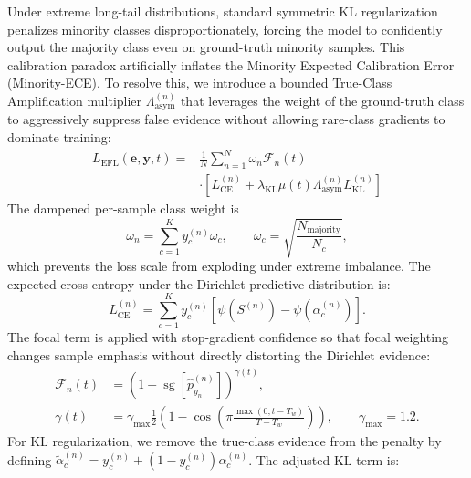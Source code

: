 \documentclass[letterpaper]{article} %
\begin{document}
Under extreme long-tail distributions, standard symmetric KL regularization penalizes minority classes disproportionately, forcing the model to confidently output the majority class even on ground-truth minority samples. This calibration paradox artificially inflates the Minority Expected Calibration Error (Minority-ECE). To resolve this, we introduce a bounded True-Class Amplification multiplier $\Lambda_{\text{asym}}^{(n)}$ that leverages the weight of the ground-truth class to aggressively suppress false evidence without allowing rare-class gradients to dominate training:
\begin{equation}\label{eq:efl}
\begin{aligned}
    L_{\text{EFL}}(\bm{e}, \bm{y}, t) ={}& \frac{1}{N} \sum_{n=1}^N
    \omega_n \mathcal{F}_n(t) \\
    &\cdot \left[ L_{\text{CE}}^{(n)} + \lambda_{\text{KL}} \mu(t)
    \Lambda_{\text{asym}}^{(n)} L_{\text{KL}}^{(n)} \right]
\end{aligned}
\end{equation}
The dampened per-sample class weight is
\begin{equation}\label{eq:sample_weight}
    \omega_n=\sum_{c=1}^{K}y_c^{(n)}\omega_c,
    \qquad
    \omega_c=\sqrt{\frac{N_{\text{majority}}}{N_c}},
\end{equation}
which prevents the loss scale from exploding under extreme imbalance. The expected cross-entropy under the Dirichlet predictive distribution is:
\begin{equation}\label{eq:dirichlet_ce}
    L_{\text{CE}}^{(n)}
    = \sum_{c=1}^K y_c^{(n)}
    \left[\psi(S^{(n)})-\psi(\alpha_c^{(n)})\right].
\end{equation}
The focal term is applied with stop-gradient confidence so that focal weighting changes sample emphasis without directly distorting the Dirichlet evidence:
\begin{equation}\label{eq:focal_schedule}
\begin{aligned}
    \mathcal{F}_n(t)
    &= \left(1-\operatorname{sg}\!\left[\hat{p}_{y_n}^{(n)}\right]\right)^{\gamma(t)},\\
    \gamma(t)
    &= \gamma_{\max}\frac{1}{2}\left(1-\cos\left(\pi
    \frac{\max(0,t-T_w)}{T-T_w}\right)\right),
    \qquad \gamma_{\max}=1.2 .
\end{aligned}
\end{equation}
For KL regularization, we remove the true-class evidence from the penalty by defining
$\tilde{\alpha}_c^{(n)}=y_c^{(n)}+(1-y_c^{(n)})\alpha_c^{(n)}$. The adjusted KL term is:
\end{document}

